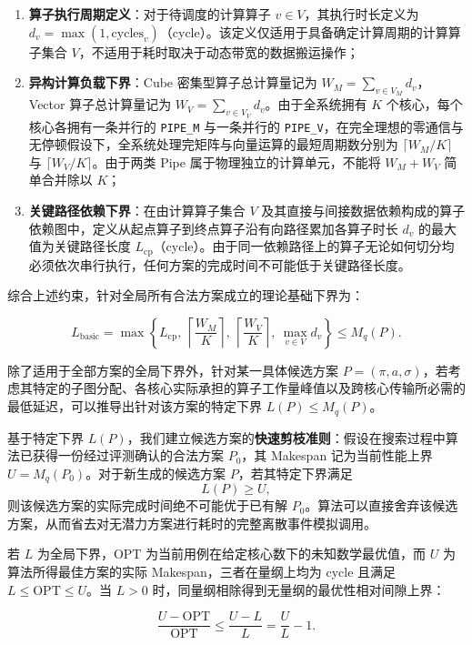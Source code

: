 \documentclass[anonymous,notoc]{gmcm2026}
\providecommand{\tightlist}{\setlength{\itemsep}{0pt}\setlength{\parskip}{0pt}}
\begin{document}
\begin{enumerate}
\def\labelenumi{\arabic{enumi}.}
\tightlist
\item
  \textbf{算子执行周期定义}：对于待调度的计算算子 \(v \in V\)，其执行时长定义为 \(d_v = \max(1, \text{cycles}_v)\)（cycle）。该定义仅适用于具备确定计算周期的计算算子集合 \(V\)，不适用于耗时取决于动态带宽的数据搬运操作；
\item
  \textbf{异构计算负载下界}：Cube 密集型算子总计算量记为 \(W_M = \sum_{v \in V_M} d_v\)，Vector 算子总计算量记为 \(W_V = \sum_{v \in V_V} d_v\)。由于全系统拥有 \(K\) 个核心，每个核心各拥有一条并行的 \texttt{PIPE\_M} 与一条并行的 \texttt{PIPE\_V}，在完全理想的零通信与无停顿假设下，全系统处理完矩阵与向量运算的最短周期数分别为 \(\lceil W_M / K \rceil\) 与 \(\lceil W_V / K \rceil\)。由于两类 Pipe 属于物理独立的计算单元，不能将 \(W_M + W_V\) 简单合并除以 \(K\)；
\item
  \textbf{关键路径依赖下界}：在由计算算子集合 \(V\) 及其直接与间接数据依赖构成的算子依赖图中，定义从起点算子到终点算子沿有向路径累加各算子时长 \(d_v\) 的最大值为关键路径长度 \(L_{\mathrm{cp}}\)（cycle）。由于同一依赖路径上的算子无论如何切分均必须依次串行执行，任何方案的完成时间不可能低于关键路径长度。
\end{enumerate}

综合上述约束，针对全局所有合法方案成立的理论基础下界为：

\[L_{\mathrm{basic}} = \max\left\{L_{\mathrm{cp}},\ \left\lceil\frac{W_M}{K}\right\rceil,\ \left\lceil\frac{W_V}{K}\right\rceil,\ \max_{v\in V}d_v\right\} \le M_q(P).\]

除了适用于全部方案的全局下界外，针对某一具体候选方案 \(P = (\pi, a, \sigma)\)，若考虑其特定的子图分配、各核心实际承担的算子工作量峰值以及跨核心传输所必需的最低延迟，可以推导出针对该方案的特定下界 \(L(P) \le M_q(P)\)。

基于特定下界 \(L(P)\)，我们建立候选方案的\textbf{快速剪枝准则}：假设在搜索过程中算法已获得一份经过评测确认的合法方案 \(P_0\)，其 Makespan 记为当前性能上界 \(U = M_q(P_0)\)。对于新生成的候选方案 \(P\)，若其特定下界满足 \[L(P) \ge U,\] 则该候选方案的实际完成时间绝不可能优于已有解 \(P_0\)。算法可以直接舍弃该候选方案，从而省去对无潜力方案进行耗时的完整离散事件模拟调用。

若 \(L\) 为全局下界，\(\mathrm{OPT}\) 为当前用例在给定核心数下的未知数学最优值，而 \(U\) 为算法所得最佳方案的实际 Makespan，三者在量纲上均为 cycle 且满足 \(L \le \mathrm{OPT} \le U\)。当 \(L > 0\) 时，同量纲相除得到无量纲的最优性相对间隙上界：

\[\frac{U - \mathrm{OPT}}{\mathrm{OPT}} \le \frac{U - L}{L} = \frac{U}{L} - 1.\]
\end{document}
